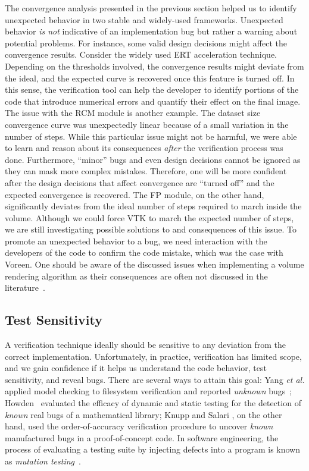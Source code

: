 The convergence analysis presented in the previous section helped us
to identify unexpected behavior in two stable and widely-used
frameworks. Unexpected behavior \emph{is not} indicative of an
implementation bug but rather a warning about potential problems. For
instance, some valid design decisions might affect the convergence
results. Consider the widely used ERT acceleration
technique. Depending on the thresholds involved, the convergence
results might deviate from the ideal, and the expected curve is
recovered once this feature is turned off. In this sense, the
verification tool can help the developer to identify portions of the
code that introduce numerical errors and quantify their effect on the
final image. The issue with the RCM module is another example. The
dataset size convergence curve was unexpectedly linear because of a
small variation in the number of steps. While this particular issue
might not be harmful, we were able to learn and reason about its
consequences \emph{after} the verification process was
done. Furthermore, ``minor'' bugs and even design decisions cannot be
ignored as they can mask more complex mistakes. Therefore, one will be
more confident after the design decisions that affect convergence are
``turned off'' and the expected convergence is recovered.  The FP
module, on the other hand, significantly deviates from the ideal
number of steps required to march inside the volume. Although we could
force VTK to march the expected number of steps, we are still
investigating possible solutions to and consequences of this issue.
To promote an unexpected behavior to a bug, we need interaction with
the developers of the code to confirm the code mistake, which was the
case with Voreen.  One should be aware of the discussed issues when
implementing a volume rendering algorithm as their consequences are
often not discussed in the
literature~\cite{Real-TimeVolumeGraphics06}.

\subsection{Test Sensitivity}
\label{sec:test-sesitivity}

A verification technique ideally should be sensitive to any deviation
from the correct implementation. Unfortunately, in practice,
verification has limited scope, and we gain confidence if it helps us
understand the code behavior, test sensitivity, and reveal bugs. There
are several ways to attain this goal: Yang \emph{et al.} applied model
checking to filesystem verification and reported \emph{unknown}
bugs~\cite{Yang:2006:UMC:1189256.1189259};
Howden~\cite{Howden:1980:ASV:357103.357107} evaluated the efficacy of
dynamic and static testing for the detection of \emph{known} real bugs
of a mathematical library; Knupp and Salari \cite{KnuppSalari02}, on
the other hand, used the order-of-accuracy verification procedure to
uncover \emph{known} manufactured bugs in a proof-of-concept code.  In
software engineering, the process of evaluating a testing suite by
injecting defects into a program is known as \emph{mutation
  testing}~\cite{Riley:2009:BTL:1667105}.

